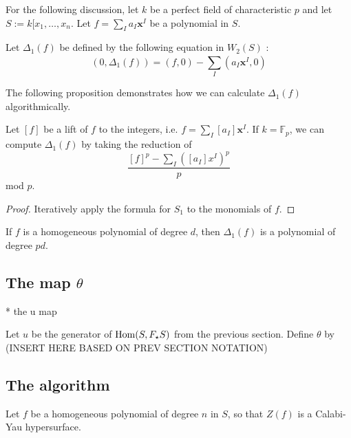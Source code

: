 For the following discussion, 
let \(k\) be a perfect field of characteristic \(p\) and 
let \(S := k[x_{1}, \ldots, x_{n}\).
Let \(f = \sum_{I}^{} a_{I}\mathbf{x}^{I}\) be a polynomial in \(S\).

\begin{defn}
	Let \(\Delta_{1}(f)\)
	be defined by the following equation in \(W_{2}(S)\) :
	\[
		(0, \Delta_{1}(f)) = (f,0) - \sum_{I}^{} (a_{I}\mathbf{x}^{I}, 0) 
	\] 
\end{defn}

The following proposition demonstrates how we can calculate 
\(\Delta_{1}(f)\) algorithmically.

\begin{prop}
	\label{prop:delta1:formula}
	Let \([f]\) be a lift of \(f\) to the integers,
	i.e.
	\(f = \sum_{I}^{} [a_{I}] \mathbf{x}^{I}\).
	If \(k = \mathbb{F}_{p}\),
	we can compute \(\Delta_{1}(f)\) by 
	taking the reduction of
	\[
		\frac{[f]^{p} - \sum_{I}^{} ([a_{I}]x^{I})^{p} }{p}
	\] 
	mod \(p\).
\end{prop}

\begin{proof}
	Iteratively apply the formula for \(S_{1}\) 
	to the monomials of \(f\).
\end{proof}

\begin{rmk}
	If \(f\) is a homogeneous polynomial of degree \(d\), 
	then \(\Delta_{1}(f)\) is a polynomial of degree \(pd\).
\end{rmk}

\subsection{The map \(\theta\)}

* the u map

Let \(u\) be the generator of \(\operatorname{Hom}(S,F_{\star}S)\) from the 
previous section.
Define \(\theta\) by  (INSERT HERE BASED ON PREV SECTION NOTATION)

\subsection{The algorithm}

Let \(f\) be a homogeneous polynomial of degree \(n\) 
in \(S\), 
so that \(Z(f)\) is a Calabi-Yau hypersurface.

